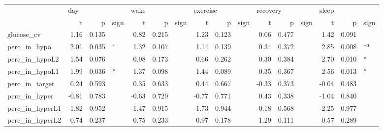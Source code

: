 \begin{tabular}{lrrlrrlrrlrrlrrl}
\toprule
{} & \multicolumn{3}{l}{day} & \multicolumn{3}{l}{wake} & \multicolumn{3}{l}{exercise} & \multicolumn{3}{l}{recovery} & \multicolumn{3}{l}{sleep} \\
{} &     t &      p & sign &     t &      p & sign &        t &      p & sign &        t &      p & sign &     t &      p & sign \\
\midrule
glucose_cv      &  1.16 &  0.135 &      &  0.82 &  0.215 &      &     1.23 &  0.123 &      &     0.06 &  0.477 &      &  1.42 &  0.091 &      \\
perc_in_hypo    &  2.01 &  0.035 &    * &  1.32 &  0.107 &      &     1.14 &  0.139 &      &     0.34 &  0.372 &      &  2.85 &  0.008 &   ** \\
perc_in_hypoL2  &  1.54 &  0.076 &      &  0.98 &  0.173 &      &     0.66 &  0.262 &      &     0.30 &  0.384 &      &  2.70 &  0.010 &    * \\
perc_in_hypoL1  &  1.99 &  0.036 &    * &  1.37 &  0.098 &      &     1.44 &  0.089 &      &     0.35 &  0.367 &      &  2.56 &  0.013 &    * \\
perc_in_target  &  0.24 &  0.593 &      &  0.35 &  0.633 &      &     0.44 &  0.667 &      &    -0.33 &  0.373 &      & -0.04 &  0.483 &      \\
perc_in_hyper   & -0.81 &  0.783 &      & -0.63 &  0.729 &      &    -0.77 &  0.771 &      &     0.43 &  0.338 &      & -1.04 &  0.840 &      \\
perc_in_hyperL1 & -1.82 &  0.952 &      & -1.47 &  0.915 &      &    -1.73 &  0.944 &      &    -0.18 &  0.568 &      & -2.25 &  0.977 &      \\
perc_in_hyperL2 &  0.74 &  0.237 &      &  0.75 &  0.233 &      &     0.97 &  0.178 &      &     1.29 &  0.111 &      &  0.57 &  0.289 &      \\
\bottomrule
\end{tabular}
